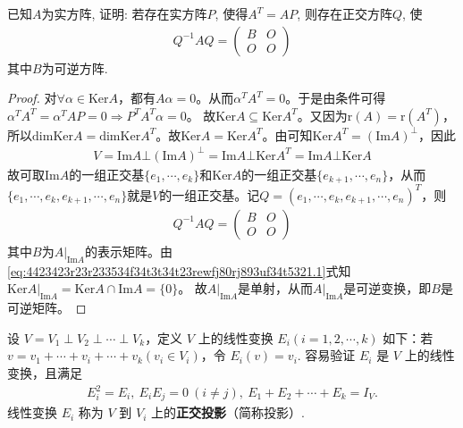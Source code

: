 \documentclass[../../main.tex]{subfiles}%
\begin{document}
\begin{example}
已知$A$为实方阵, 证明: 若存在实方阵$P$, 使得$A^{T} = AP$, 则存在正交方阵$Q$, 使\begin{align*}Q^{-1}AQ = \begin{pmatrix} B & O \\ O & O \end{pmatrix}\end{align*}其中$B$为可逆方阵.
\end{example}
\begin{proof}

对$\forall \alpha \in \mathrm{Ker}A$，都有$A\alpha =0$。从而$\alpha ^TA^T=0$。于是由条件可得
$\alpha ^TA^T=\alpha ^TAP=0\Longrightarrow P^TA^T\alpha =0$。
故$\mathrm{Ker}A\subseteq \mathrm{Ker}A^T$。又因为$\mathrm{r}(A) =\mathrm{r}(A^T)$，所以$\mathrm{dimKer}A=\mathrm{dimKer}A^T$。故$\mathrm{Ker}A=\mathrm{Ker}A^T$。由可知$\mathrm{Ker}A^T=\left( \mathrm{Im}A \right) ^{\bot}$，因此
\begin{align}\label{eq:4423423r23r233534f34t3t34t23rewfj80rj893uf34t5321.1}
V=\mathrm{Im}A\bot \left( \mathrm{Im}A \right) ^{\bot}=\mathrm{Im}A\bot \mathrm{Ker}A^T=\mathrm{Im}A\bot \mathrm{Ker}A
\end{align}
故可取$\mathrm{Im}A$的一组正交基$\{ e_1,\cdots ,e_k \}$和$\mathrm{Ker}A$的一组正交基$\{ e_{k+1},\cdots ,e_n \}$，从而
$\{ e_1,\cdots ,e_k,e_{k+1},\cdots ,e_n \}$就是$V$的一组正交基。记$Q=\left( e_1,\cdots ,e_k,e_{k+1},\cdots ,e_n \right) ^T$，则
\begin{align*}
Q^{-1}AQ=\begin{pmatrix}
B&		O\\
O&		O
\end{pmatrix}
\end{align*}
其中$B$为$A|_{\mathrm{Im}A}$的表示矩阵。由\eqref{eq:4423423r23r233534f34t3t34t23rewfj80rj893uf34t5321.1}式知
$\mathrm{Ker}A|_{\mathrm{Im}A}=\mathrm{Ker}A\cap \mathrm{Im}A=\{ 0 \}$。
故$A|_{\mathrm{Im}A}$是单射，从而$A|_{\mathrm{Im}A}$是可逆变换，即$B$是可逆矩阵。

\end{proof}

\begin{definition}[正交投影]
设 $V = V_1 \perp V_2 \perp \cdots \perp V_k$，定义 $V$ 上的线性变换 $E_i (i = 1, 2, \cdots, k)$ 如下：若 $v = v_1 + \cdots + v_i + \cdots + v_k (v_i \in V_i)$，令 $E_i(v) = v_i$. 容易验证 $E_i$ 是 $V$ 上的线性变换，且满足
\begin{align*}
E_i^2 = E_i, \ E_iE_j = 0\ (i \neq j), \ E_1 + E_2 + \cdots + E_k = I_V.
\end{align*}
线性变换 $E_i$ 称为 $V$ 到 $V_i$ 上的\textbf{正交投影}（简称投影）.
\end{definition}
\end{document}
